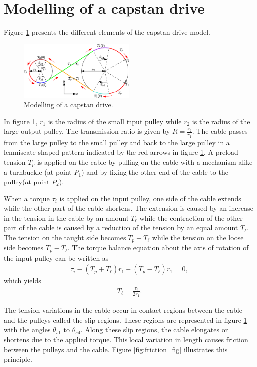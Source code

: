 \documentclass[10pt,cleanfoot]{asme2ej}
\begin{document}
\section{Modelling of a capstan drive}
Figure \ref{fig:model_capstan} presents the different elements of the capstan drive model.
\begin{figure}
    \centering
    \includegraphics[width=0.5\textwidth]{modelling_of_capstan_drive.eps}
    \caption{Modelling of a capstan drive.}
    \label{fig:model_capstan}
\end{figure}
In figure \ref{fig:model_capstan}, $r_1$ is the radius of the small input pulley while $r_2$ is the radius of the large output pulley. The transmission ratio is given by $R = \frac{r_2}{r_1}$. The cable passes from the large pulley to the small pulley and back to the large pulley in a lemniscate shaped pattern indicated by the red arrows in figure \ref{fig:model_capstan}. A preload tension $T_p$ is applied on the cable by pulling on the cable with a mechanism alike a turnbuckle (at point $P_1$) and by fixing the other end of the cable to the pulley(at point $P_2$).\par
When a torque $\tau_i$ is applied on the input pulley, one side of the cable extends while the other part of the cable shortens. The extension is caused by an increase in the tension in the cable by an amount $T_\ell$ while the contraction of the other part of the cable is caused by a reduction of the tension by an equal amount $T_\ell$. The tension on the taught side becomes $T_p+T_\ell$ while the tension on the loose side becomes $T_p-T_\ell$. The torque balance equation about the axis of rotation of the input pulley can be written as
\begin{align}
    \tau_i - (T_p+T_\ell)r_1 + (T_p-T_\ell)r_1 = 0, \label{eq:first_equation_p0}
\end{align}
which yields
\begin{align}
T_\ell = \frac{\tau_i}{2r_1}.
\label{eq:first_equation}
\end{align}
\par
The tension variations in the cable occur in contact regions between the cable and the pulleys called the slip regions. These regions are represented in figure \ref{fig:model_capstan} with the angles $\theta_{s1}$ to $\theta_{s4}$. Along these slip regions, the cable elongates or shortens due to the applied torque. This local variation in length causes friction between the pulleys and the cable. Figure \ref{fig:friction_fig} illustrates this principle. 
\end{document}
